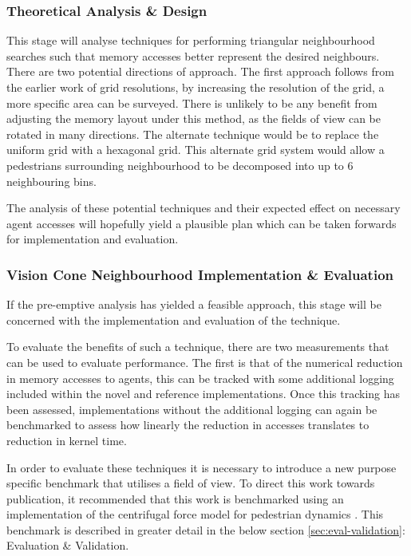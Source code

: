       \subsubsection*{Theoretical Analysis \& Design}
        This stage will analyse techniques for performing triangular neighbourhood searches such that memory accesses better represent the desired neighbours. There are two potential directions of approach. The first approach follows from the earlier work of grid resolutions, by increasing the resolution of the grid, a more specific area can be surveyed. There is unlikely to be any benefit from adjusting the memory layout under this method, as the fields of view can be rotated in many directions. The alternate technique would be to replace the uniform grid with a hexagonal grid. This alternate grid system would allow a pedestrians surrounding neighbourhood to be decomposed into up to 6 neighbouring bins. 
        
        The analysis of these potential techniques and their expected effect on necessary agent accesses will hopefully yield a plausible plan which can be taken forwards for implementation and evaluation.
        
      \subsubsection*{Vision Cone Neighbourhood Implementation \& Evaluation}
        If the pre-emptive analysis has yielded a feasible approach, this stage will be concerned with the implementation and evaluation of the technique.
        
        To evaluate the benefits of such a technique, there are two measurements that can be used to evaluate performance. The first is that of the numerical reduction in memory accesses to agents, this can be tracked with some additional logging included within the novel and reference implementations. Once this tracking has been assessed, implementations without the additional logging can again be benchmarked to assess how linearly the reduction in accesses translates to reduction in kernel time.
        
        In order to evaluate these techniques it is necessary to introduce a new purpose specific benchmark that utilises a field of view. To direct this work towards publication, it recommended that this work is benchmarked using an implementation of the centrifugal force model for pedestrian dynamics \cite{YC*05}. This benchmark is described in greater detail in the below section \ref{sec:eval-validation}: Evaluation \& Validation.
        
